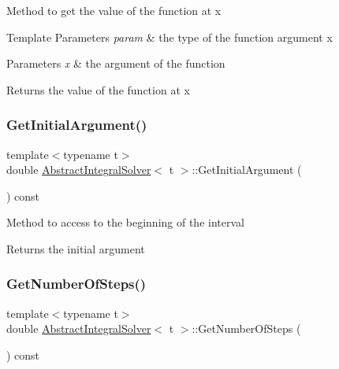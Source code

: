 Method to get the value of the function at x 
\begin{DoxyTemplParams}{Template Parameters}
{\em param} & the type of the function argument x \\
\hline
\end{DoxyTemplParams}

\begin{DoxyParams}{Parameters}
{\em x} & the argument of the function \\
\hline
\end{DoxyParams}
\begin{DoxyReturn}{Returns}
the value of the function at x 
\end{DoxyReturn}
\mbox{\label{class_abstract_integral_solver_adb8ef30d8231a173ee85e91155829daa}} 
\subsubsection{\texorpdfstring{Get\+Initial\+Argument()}{GetInitialArgument()}}
{\footnotesize\ttfamily template$<$typename t$>$ \\
double \hyperlink{class_abstract_integral_solver}{Abstract\+Integral\+Solver}$<$ t $>$\+::Get\+Initial\+Argument (\begin{DoxyParamCaption}{ }\end{DoxyParamCaption}) const\hspace{0.3cm}{\ttfamily [inline]}}

Method to access to the beginning of the interval \begin{DoxyReturn}{Returns}
the initial argument 
\end{DoxyReturn}
\mbox{\label{class_abstract_integral_solver_a90148ecbeb6396638c428a319a7031dd}} 
\subsubsection{\texorpdfstring{Get\+Number\+Of\+Steps()}{GetNumberOfSteps()}}
{\footnotesize\ttfamily template$<$typename t$>$ \\
double \hyperlink{class_abstract_integral_solver}{Abstract\+Integral\+Solver}$<$ t $>$\+::Get\+Number\+Of\+Steps (\begin{DoxyParamCaption}{ }\end{DoxyParamCaption}) const\hspace{0.3cm}{\ttfamily [inline]}}


